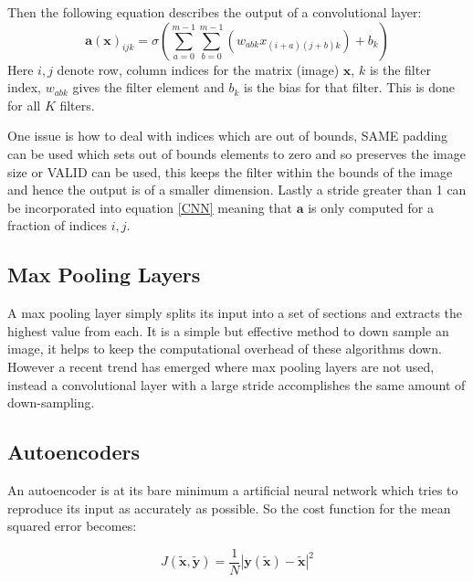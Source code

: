     Then the following equation describes the output of a convolutional layer:
    \begin{equation} \label{CNN}
      \mathbf{a}(\mathbf{x})_{ijk} = \sigma \left ( \sum_{a=0}^{m-1}\sum_{b=0}^{m-1}(w_{abk}x_{(i+a)(j+b)k}) + b_k \right )
    \end{equation}
    Here $i,j$  denote row, column indices for the matrix (image) $\mathbf{x}$, $k$ is the filter index, $w_{abk}$
    gives the filter element and $b_k$ is the bias for that filter. This is done for all $K$ filters.

    One issue is how to deal with indices which are out of bounds, SAME padding can be used which sets out of bounds
    elements to zero and so preserves the image size or VALID can be used, this keeps the filter within the bounds of the
    image and hence the output is of a smaller dimension. Lastly a stride greater than 1 can be incorporated into equation
    \ref{CNN} meaning that $\mathbf{a}$ is only computed for a fraction of indices $i,j$.
  \subsection{Max Pooling Layers}
    A max pooling layer simply splits its input into a set of sections and extracts
    the highest value from each. It is a simple but effective method to down sample
    an image, it helps to keep the computational overhead of these algorithms
    down. However a recent trend \cite{Springenberg2015} has emerged where max pooling
    layers are not used, instead a convolutional layer with a large stride accomplishes
    the same amount of down-sampling.
  \subsection{Autoencoders}
    An autoencoder is at its bare minimum a artificial neural network which tries
    to reproduce its input as accurately as possible. So the cost function for the mean squared error becomes:

    \begin{equation} \label{eq:autoencoder_cost}
      J(\tilde{\mathbf{x}},\tilde{\mathbf{y}}) = \frac{1}{N}\left |\mathbf{y}(\tilde{\mathbf{x}})-\tilde{\mathbf{x}}\right | ^2
    \end{equation}

